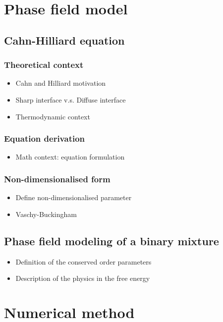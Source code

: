 \section{Phase field model}
    \subsection{Cahn-Hilliard equation}
        \subsubsection{Theoretical context}
        \begin{itemize}
            \item Cahn and Hilliard motivation
            \item Sharp interface v.s. Diffuse interface
            \item Thermodynamic context
        \end{itemize}
        \subsubsection{Equation derivation}
        \begin{itemize}
            \item Math context: equation formulation
        \end{itemize}
        \subsubsection{Non-dimensionalised form}
        \begin{itemize}
            \item Define non-dimensionalised parameter
            \item Vaschy-Buckingham 
        \end{itemize}
    \subsection{Phase field modeling of a binary mixture}
        \begin{itemize}
            \item Definition of the conserved order parameters
            \item Description of the physics in the free energy
        \end{itemize}
\section{Numerical method}

